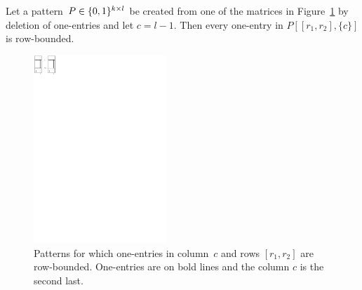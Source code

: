 \begin{lemma}
\label{lemma:I2}
Let a pattern~$P\in\{0,1\}^{k\times l}$ be created from one of the matrices in Figure~\ref{fig:lemmaI2} by deletion of one-entries and let $c=l-1$. Then every one-entry in $P[[r_1,r_2],\{c\}]$ is row-bounded.

\begin{figure}[!ht]
\centering
\includegraphics[width=50mm]{img/lemmaI2.pdf}
\caption{Patterns for which one-entries in column~$c$ and rows $[r_1,r_2]$ are row-bounded. One-entries are on bold lines and the column $c$ is the second last.}
\label{fig:lemmaI2}
\end{figure}
\end{lemma}

